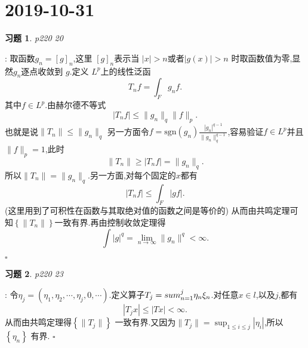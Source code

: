 \documentclass[a4paper]{article}
\newtheorem*{exe}{习题}
\newenvironment{sol}{{\noindent\bfseries 解}:}{\hfill $\square$\par}
\begin{document}
\section{2019-10-31}
\begin{exe}
  p220 20
\end{exe}
\begin{sol}
  取函数$g_n=[g]_n$,这里 $[g]_n$表示当 $ \left| x \right| >n$或者$\left| g(x) \right|>n $ 时取函数值为零,显然$g_n$逐点收敛到 $g$.定义 $L^p$上的线性泛函
   \[
  T_nf=\int_F g_n f
  .\] 
  其中$f\in L^p$.由赫尔德不等式
  \[
  \left| T_nf \right| \le \|g_n\|_q \|f\|_p
 . \] 
 也就是说$\|T_n\|\le \|g_n\|_q$
 另一方面令$f=\text{sgn}\left( g_n \right) \frac{|g_n|^{q-1}}{\|g_n\|_q^{q-1}}$,容易验证$f\in L^p$并且$\|f\|_p=1$,此时
 \[
 \|T_n\|\ge \left| T_nf \right| =\|g_n\|_q
 .\] 
 所以$\|T_n\|=\|g_n\|_q$.另一方面,对每个固定的$x$都有
 \[
 \left| T_nf \right| \le \int_F \left| gf \right| 
 .\] 
 (这里用到了可积性在函数与其取绝对值的函数之间是等价的) 从而由共鸣定理可知$\left\{ \|T_n\| \right\} $一致有界.再由控制收敛定理得
 \[
 \int \left| g \right| ^q=\lim_{n \to \infty} \|g_n\|^q<\infty
 .\]

\end{sol}
 \begin{exe}
   p220 23
 \end{exe}
 \begin{sol}
   令$\eta_j=\left( \eta_1,\eta_2,\cdots,\eta_j,0,\cdots \right) $.定义算子$T_j=\\sum_{n=1}^{j} \eta_n\xi_n$.对任意$x\in l$,以及$j$,都有
    \[
   \left| T_jx \right| \le \left| Tx \right| <\infty
   .\] 
   从而由共鸣定理得$\left\{ \|T_j\| \right\} $ 一致有界.又因为$\|T_j\|=\sup_{1\le i\le j}\left| \eta_i \right| $,所以$\left\{ \eta_n \right\} $ 有界.
 \end{sol}
\end{document}
